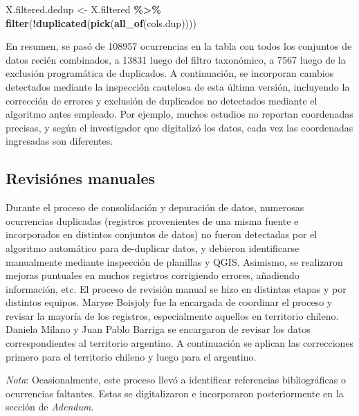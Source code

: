 \documentclass[sn-apa,pdflatex]{sn-jnl}
\newenvironment{Shaded}{\begin{snugshade}}{\end{snugshade}}
\newcommand{\FunctionTok}[1]{\textcolor[rgb]{0.13,0.29,0.53}{\textbf{#1}}}
\newcommand{\NormalTok}[1]{#1}
\newcommand{\OtherTok}[1]{\textcolor[rgb]{0.56,0.35,0.01}{#1}}
\newcommand{\SpecialCharTok}[1]{\textcolor[rgb]{0.81,0.36,0.00}{\textbf{#1}}}
\begin{document}
\begin{Shaded}
\begin{Highlighting}[]
\NormalTok{X.filtered.dedup }\OtherTok{\textless{}{-}}\NormalTok{ X.filtered }\SpecialCharTok{\%\textgreater{}\%}
    \FunctionTok{filter}\NormalTok{(}\SpecialCharTok{!}\FunctionTok{duplicated}\NormalTok{(}\FunctionTok{pick}\NormalTok{(}\FunctionTok{all\_of}\NormalTok{(cols.dup))))}
\end{Highlighting}
\end{Shaded}

En resumen, se pasó de 108957 ocurrencias en la tabla con todos los
conjuntos de datos recién combinados, a 13831 luego del filtro
taxonómico, a 7567 luego de la exclusión programática de duplicados. A
continuación, se incorporan cambios detectados mediante la inspección
cautelosa de esta última versión, incluyendo la corrección de errores y
exclusión de duplicados no detectados mediante el algoritmo antes
empleado. Por ejemplo, muchos estudios no reportan coordenadas precisas,
y según el investigador que digitalizó los datos, cada vez las
coordenadas ingresadas son diferentes.

\subsection{Revisiónes manuales}\label{revisiuxf3nes-manuales}

Durante el proceso de consolidación y depuración de datos, numerosas
ocurrencias duplicadas (registros provenientes de una misma fuente e
incorporados en distintos conjuntos de datos) no fueron detectadas por
el algoritmo automático para de-duplicar datos, y debieron identificarse
manualmente mediante inspección de planillas y QGIS. Asimismo, se
realizaron mejoras puntuales en muchos registros corrigiendo errores,
añadiendo información, etc. El proceso de revisión manual se hizo en
distintas etapas y por distintos equipos. Maryse Boisjoly fue la
encargada de coordinar el proceso y revisar la mayoría de los registros,
especialmente aquellos en territorio chileno. Daniela Milano y Juan
Pablo Barriga se encargaron de revisar los datos correspondientes al
territorio argentino. A continuación se aplican las correcciones primero
para el territorio chileno y luego para el argentino.

\emph{Nota}: Ocasionalmente, este proceso llevó a identificar
referencias bibliográficas o ocurrencias faltantes. Estas se
digitalizaron e incorporaron posteriormente en la sección de
\emph{Adendum}.
\end{document}
